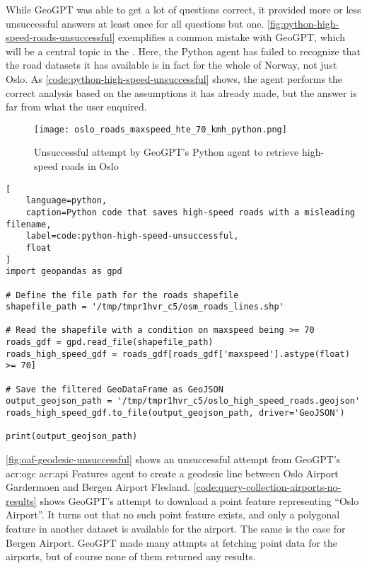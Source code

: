 While GeoGPT was able to get a lot of questions correct, it provided more or less unsuccessful answers at least once for all questions but one. \autoref{fig:python-high-speed-roads-unsuccessful} exemplifies a common mistake with GeoGPT, which will be a central topic in the . Here, the Python agent has failed to recognize that the road datasets it has available is in fact for the whole of Norway, not just Oslo. As \autoref{code:python-high-speed-unsuccessful} shows, the agent performs the correct analysis based on the assumptions it has already made, but the answer is far from what the user enquired.

\begin{figure}[htbp]
    \centering
    \texttt{[image: oslo\_roads\_maxspeed\_hte\_70\_kmh\_python.png]}
    \caption{Unsuccessful attempt by GeoGPT's Python agent to retrieve high-speed roads in Oslo}
    \label{fig:python-high-speed-roads-unsuccessful}
\end{figure}

\FloatBarrier

\begin{lstlisting}[
    language=python,
    caption=Python code that saves high-speed roads with a misleading filename,
    label=code:python-high-speed-unsuccessful,
    float
]
import geopandas as gpd

# Define the file path for the roads shapefile
shapefile_path = '/tmp/tmpr1hvr_c5/osm_roads_lines.shp'

# Read the shapefile with a condition on maxspeed being >= 70
roads_gdf = gpd.read_file(shapefile_path)
roads_high_speed_gdf = roads_gdf[roads_gdf['maxspeed'].astype(float) >= 70]

# Save the filtered GeoDataFrame as GeoJSON
output_geojson_path = '/tmp/tmpr1hvr_c5/oslo_high_speed_roads.geojson'
roads_high_speed_gdf.to_file(output_geojson_path, driver='GeoJSON')

print(output_geojson_path)
\end{lstlisting}

\FloatBarrier

\autoref{fig:oaf-geodesic-unsuccessful} shows an unsuccessful attempt from GeoGPT's \acrshort{acr:ogc} \acrshort{acr:api} Features agent to create a geodesic line between Oslo Airport Gardermoen and Bergen Airport Flesland. \autoref{code:query-collection-airports-no-results} shows GeoGPT's attempt to download a point feature representing \enquote{Oslo Airport}. It turns out that no such point feature exists, and only a polygonal feature in another dataset is available for the airport. The same is the case for Bergen Airport. GeoGPT made many attmpts at fetching point data for the airports, but of course none of them  returned any results.

